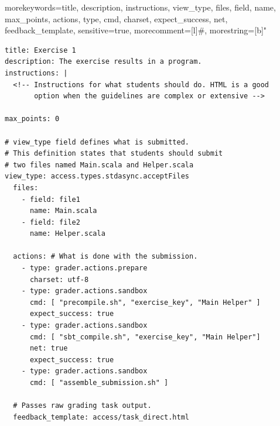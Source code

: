 
 {
  morekeywords={title, description, instructions, view_type, files, field, name, max_points, actions, type, cmd,
								charset, expect_success, net, feedback_template},
  sensitive=true, %
  morecomment=[l]{\#}, %
  morestring=[b]" %
}



\begin{program}
\begin{lstlisting}
title: Exercise 1
description: The exercise results in a program.
instructions: | 
  <!-- Instructions for what students should do. HTML is a good
       option when the guidelines are complex or extensive -->

max_points: 0

# view_type field defines what is submitted.
# This definition states that students should submit
# two files named Main.scala and Helper.scala
view_type: access.types.stdasync.acceptFiles
  files:
    - field: file1
      name: Main.scala
    - field: file2
      name: Helper.scala

  actions: # What is done with the submission.
    - type: grader.actions.prepare
      charset: utf-8
    - type: grader.actions.sandbox
      cmd: [ "precompile.sh", "exercise_key", "Main Helper" ]
      expect_success: true
    - type: grader.actions.sandbox
      cmd: [ "sbt_compile.sh", "exercise_key", "Main Helper"]
      net: true
      expect_success: true
    - type: grader.actions.sandbox
      cmd: [ "assemble_submission.sh" ]

  # Passes raw grading task output.
  feedback_template: access/task_direct.html

\end{lstlisting}
\end{program}


